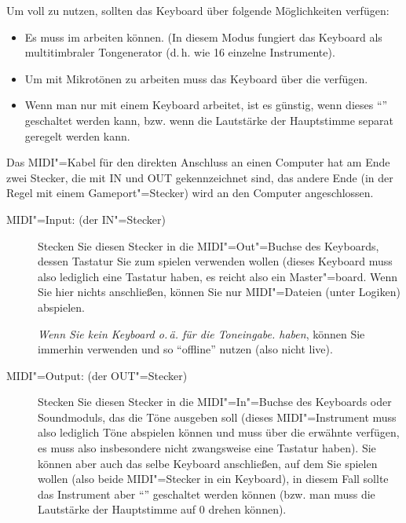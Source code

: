 Um \mutabor{} voll zu nutzen, sollten das Keyboard über folgende 
Möglichkeiten verfügen:

\begin{itemize}
\item Es muss im  arbeiten können.
  (In diesem Modus fungiert das Keyboard als multitimbraler
  Tongenerator (d.\,h. wie 16 einzelne Instrumente).
\item Um mit Mikrotönen zu arbeiten muss das Keyboard über die
   verfügen.
\item Wenn man nur mit einem Keyboard arbeitet, ist es günstig, wenn
  dieses "`"' geschaltet werden kann, bzw.
  wenn die Lautstärke der Hauptstimme separat geregelt werden kann.
\end{itemize}

Das MIDI"=Kabel für den direkten Anschluss an einen Computer hat am
Ende zwei Stecker, die mit IN und OUT gekennzeichnet sind, das andere
Ende (in der Regel mit einem Gameport"=Stecker) wird an den Computer
angeschlossen.

\begin{description}
\item[MIDI"=Input: (der IN"=Stecker)] Stecken Sie diesen Stecker in
  die MIDI"=Out"=Buchse des Keyboards, dessen Tastatur Sie zum spielen
  verwenden wollen (dieses Keyboard muss also lediglich eine Tastatur
  haben, es reicht also ein Master"=board. Wenn Sie hier nichts
  anschließen, können Sie nur MIDI"=Dateien (unter Logiken) abspielen.

  \emph{Wenn Sie kein Keyboard o.\,ä. für die Toneingabe.  haben},
  können Sie immerhin  verwenden und so \mutabor{} "`offline"' nutzen (also
  nicht live).
\item[MIDI"=Output: (der OUT"=Stecker)] Stecken Sie diesen Stecker in
  die MIDI"=In"=Buchse des Keyboards oder Soundmoduls, das die Töne
  ausgeben soll (dieses MIDI"=Instrument muss also lediglich Töne
  abspielen können und muss über die erwähnte
   verfügen, es muss also
  insbesondere nicht zwangsweise eine Tastatur haben). Sie können aber
  auch das selbe Keyboard anschließen, auf dem Sie spielen wollen
  (also beide MIDI"=Stecker in ein Keyboard), in diesem Fall sollte
  das Instrument aber "`"' geschaltet
  werden können (bzw. man muss die Lautstärke der Hauptstimme auf 0
  drehen können).
\end{description}



